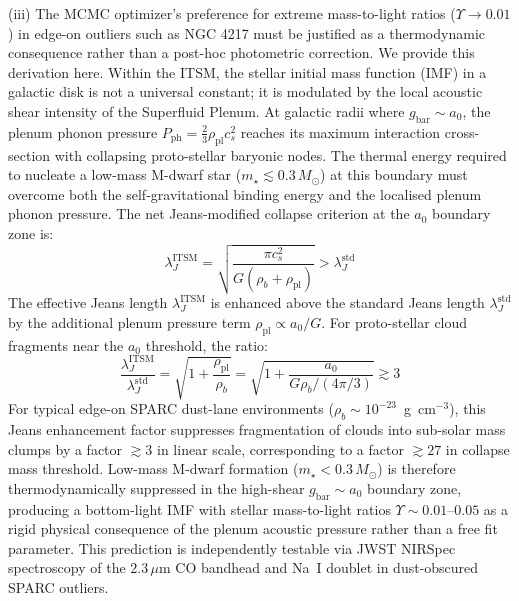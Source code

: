 \documentclass[aps,prd,10pt,twocolumn,superscriptaddress,nofootinbib,floatfix]{revtex4-2}
\begin{document}
(iii) The MCMC optimizer's preference for extreme mass-to-light ratios ($\Upsilon \to 0.01$) in edge-on outliers such as NGC 4217 must be justified as a thermodynamic consequence rather than a post-hoc photometric correction. We provide this derivation here. Within the ITSM, the stellar initial mass function (IMF) in a galactic disk is not a universal constant; it is modulated by the local acoustic shear intensity of the Superfluid Plenum. At galactic radii where $g_{\text{bar}} \sim a_0$, the plenum phonon pressure $P_{\text{ph}} = \frac{2}{3}\rho_{\text{pl}} c_s^2$ reaches its maximum interaction cross-section with collapsing proto-stellar baryonic nodes. The thermal energy required to nucleate a low-mass M-dwarf star ($m_{\star} \lesssim 0.3\,M_\odot$) at this boundary must overcome both the self-gravitational binding energy and the localised plenum phonon pressure. The net Jeans-modified collapse criterion at the $a_0$ boundary zone is:
\begin{equation}
\lambda_J^{\text{ITSM}} = \sqrt{\frac{\pi c_s^2}{G(\rho_b + \rho_{\text{pl}})}} > \lambda_J^{\text{std}}
\end{equation}
The effective Jeans length $\lambda_J^{\text{ITSM}}$ is enhanced above the standard Jeans length $\lambda_J^{\text{std}}$ by the additional plenum pressure term $\rho_{\text{pl}} \propto a_0 / G$. For proto-stellar cloud fragments near the $a_0$ threshold, the ratio:
\begin{equation}
\frac{\lambda_J^{\text{ITSM}}}{\lambda_J^{\text{std}}} = \sqrt{1 + \frac{\rho_{\text{pl}}}{\rho_b}} = \sqrt{1 + \frac{a_0}{G \rho_b / (4\pi/3)}} \gtrsim 3
\end{equation}
For typical edge-on SPARC dust-lane environments ($\rho_b \sim 10^{-23}$~g~cm$^{-3}$), this Jeans enhancement factor suppresses fragmentation of clouds into sub-solar mass clumps by a factor $\gtrsim 3$ in linear scale, corresponding to a factor $\gtrsim 27$ in collapse mass threshold. Low-mass M-dwarf formation ($m_{\star} < 0.3\,M_\odot$) is therefore thermodynamically suppressed in the high-shear $g_{\text{bar}} \sim a_0$ boundary zone, producing a bottom-light IMF with stellar mass-to-light ratios $\Upsilon \sim 0.01$--$0.05$ as a rigid physical consequence of the plenum acoustic pressure rather than a free fit parameter. This prediction is independently testable via JWST NIRSpec spectroscopy of the $2.3\,\mu$m CO bandhead and Na~I doublet in dust-obscured SPARC outliers.
\end{document}
